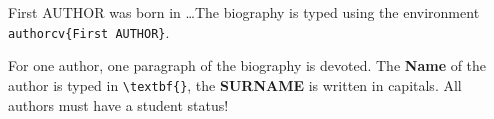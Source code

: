 \documentclass{poster15}
\begin{document}
\begin{authorcv}{First AUTHOR}
was born in \dots The biography is typed using the environment \verb+authorcv{First AUTHOR}+. 

For one author, one paragraph of the biography is devoted. The \textbf{Name} of the author is typed in  \verb+\textbf{}+, the \textbf{SURNAME} is written in capitals.  All authors must have a student status!
\end{authorcv}
\end{document}
